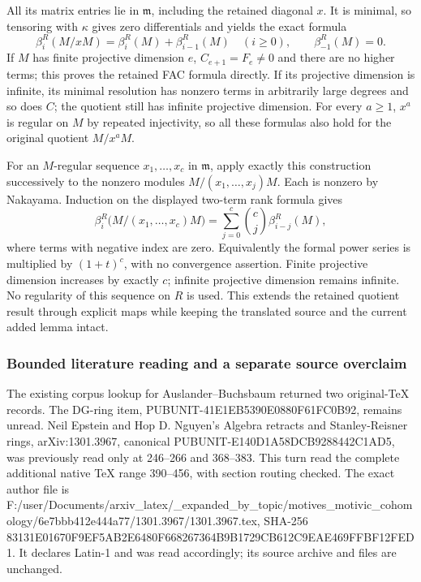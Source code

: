 All its matrix entries lie in \(\mathfrak m\), including the retained diagonal \(x\). It is minimal, so tensoring with \(\kappa\) gives zero differentials and yields the exact formula \[
\beta_i^R(M/xM)=\beta_i^R(M)+\beta_{i-1}^R(M)
\quad(i\ge0),\qquad \beta_{-1}^R(M)=0 .
\] If \(M\) has finite projective dimension \(e\), \(C_{e+1}=F_e\ne0\) and there are no higher terms; this proves the retained FAC formula directly. If its projective dimension is infinite, its minimal resolution has nonzero terms in arbitrarily large degrees and so does \(C\); the quotient still has infinite projective dimension. For every \(a\ge1\), \(x^a\) is regular on \(M\) by repeated injectivity, so all these formulas also hold for the original quotient \(M/x^aM\).

For an \(M\)-regular sequence \(x_1,\ldots,x_c\) in \(\mathfrak m\), apply exactly this construction successively to the nonzero modules \(M/(x_1,\ldots,x_j)M\). Each is nonzero by Nakayama. Induction on the displayed two-term rank formula gives \[
\beta_i^R\bigl(M/(x_1,\ldots,x_c)M\bigr)
=\sum_{j=0}^c\binom cj\beta_{i-j}^R(M),
\] where terms with negative index are zero. Equivalently the formal power series is multiplied by \((1+t)^c\), with no convergence assertion. Finite projective dimension increases by exactly \(c\); infinite projective dimension remains infinite. No regularity of this sequence on \(R\) is used. This extends the retained quotient result through explicit maps while keeping the translated source and the current added lemma intact.

\subsubsection{Bounded literature reading and a separate source overclaim}\label{bounded-literature-reading-and-a-separate-source-overclaim}

The existing corpus lookup for Auslander--Buchsbaum returned two original-TeX records. The DG-ring item, PUBUNIT-41E1EB5390E0880F61FC0B92, remains unread. Neil Epstein and Hop D. Nguyen's Algebra retracts and Stanley-Reisner rings, arXiv:1301.3967, canonical PUBUNIT-E140D1A58DCB9288442C1AD5, was previously read only at 246--266 and 368--383. This turn read the complete additional native TeX range 390--456, with section routing checked. The exact author file is F:/user/Documents/arxiv\_latex/\_expanded\_by\_topic/motives\_motivic\_cohomology/6e7bbb412e444a77/1301.3967/1301.3967.tex, SHA-256 83131E01670F9EF5AB2E6480F668267364B9B1729CB612C9EAE469FFBF12FED1. It declares Latin-1 and was read accordingly; its source archive and files are unchanged.

